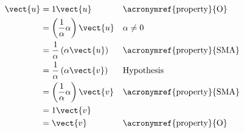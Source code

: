 \begin{align*}
\vect{u}
&=1\vect{u}&&\text{\acronymref{property}{O}}\\
&=\left(\frac{1}{\alpha}\alpha\right)\vect{u}&&\alpha\neq 0\\
&=\frac{1}{\alpha}\left(\alpha\vect{u}\right)&&\text{\acronymref{property}{SMA}}\\
&=\frac{1}{\alpha}\left(\alpha\vect{v}\right)&&\text{Hypothesis}\\
&=\left(\frac{1}{\alpha}\alpha\right)\vect{v}&&\text{\acronymref{property}{SMA}}\\
&=1\vect{v}\\
&=\vect{v}&&\text{\acronymref{property}{O}}
%
\end{align*}
